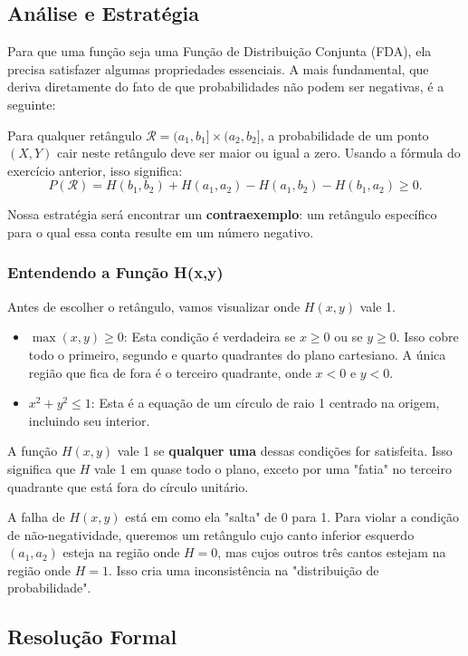 \documentclass[12pt]{article}
\begin{document}
\hrulefill

\subsection*{Análise e Estratégia}

Para que uma função seja uma Função de Distribuição Conjunta (FDA), ela precisa satisfazer algumas propriedades essenciais. A mais fundamental, que deriva diretamente do fato de que probabilidades não podem ser negativas, é a seguinte:

Para qualquer retângulo $\mathcal{R} = (a_1, b_1] \times (a_2, b_2]$, a probabilidade de um ponto $(X,Y)$ cair neste retângulo deve ser maior ou igual a zero. Usando a fórmula do exercício anterior, isso significa:
\[ P(\mathcal{R}) = H(b_1, b_2) + H(a_1, a_2) - H(a_1, b_2) - H(b_1, a_2) \ge 0. \]

Nossa estratégia será encontrar um \textbf{contraexemplo}: um retângulo específico para o qual essa conta resulte em um número negativo.

\subsubsection*{Entendendo a Função H(x,y)}

Antes de escolher o retângulo, vamos visualizar onde $H(x,y)$ vale 1.
\begin{itemize}
    \item \textbf{$\max(x,y) \ge 0$}: Esta condição é verdadeira se $x \ge 0$ ou se $y \ge 0$. Isso cobre todo o primeiro, segundo e quarto quadrantes do plano cartesiano. A única região que fica de fora é o terceiro quadrante, onde $x<0$ e $y<0$.
    \item \textbf{$x^2+y^2 \le 1$}: Esta é a equação de um círculo de raio 1 centrado na origem, incluindo seu interior.
\end{itemize}
A função $H(x,y)$ vale 1 se \textbf{qualquer uma} dessas condições for satisfeita. Isso significa que $H$ vale 1 em quase todo o plano, exceto por uma "fatia" no terceiro quadrante que está fora do círculo unitário.

A falha de $H(x,y)$ está em como ela "salta" de 0 para 1. Para violar a condição de não-negatividade, queremos um retângulo cujo canto inferior esquerdo $(a_1, a_2)$ esteja na região onde $H=0$, mas cujos outros três cantos estejam na região onde $H=1$. Isso cria uma inconsistência na "distribuição de probabilidade".

\subsection*{Resolução Formal}
\end{document}
